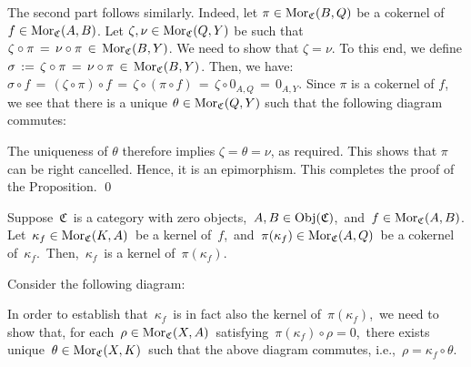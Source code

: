 \vskip 0.1cm
The second part follows similarly.
Indeed, let 
$\pi \in \textnormal{Mor}_{\mathfrak{C}}(B,Q)$ be a cokernel of $f \in \textnormal{Mor}_{\mathfrak{C}}(A,B)$.
Let $\zeta, \nu \in \textnormal{Mor}_{\mathfrak{C}}(Q,Y)$ be such that
$\zeta \circ \pi \,=\, \nu \circ \pi \,\in\, \textnormal{Mor}_{\mathfrak{C}}(B,Y)$.
We need to show that $\zeta = \nu$.
To this end, we define $\sigma \,:=\, \zeta \circ \pi \,=\, \nu \circ \pi \,\in\, \textnormal{Mor}_{\mathfrak{C}}(B,Y)$.
Then, we have: 
$\sigma \circ f \,=\, (\zeta \circ \pi) \circ f \,=\, \zeta \circ (\pi \circ f) \,=\, \zeta \circ 0_{A,Q} \,=\, 0_{A,Y}$.
Since $\pi$ is a cokernel of $f$, we see that there is a unique $\theta \in \textnormal{Mor}_{\mathfrak{C}}(Q,Y)$
such that the following diagram commutes:
\begin{center}
\end{center}
The uniqueness of $\theta$ therefore implies $\zeta = \theta = \nu$, as required.
This shows that $\pi$ can be right cancelled.
Hence, it is an epimorphism.
This completes the proof of the Proposition.
\qed


\vskip 0.5cm
\begin{proposition}
\mbox{}
\vskip 0.1cm
\noindent
Suppose \,$\mathfrak{C}$\, is a category with zero objects,
\,$A, B \in \textnormal{Obj}(\mathfrak{C})$,\, and
\,$f \in \textnormal{Mor}_{\mathfrak{C}}(A,B)$.
Let \,$\kappa_{f} \in \textnormal{Mor}_{\mathfrak{C}}(K,A)$\, be a kernel of \,$f$,\,
and \,$\pi(\kappa_{f}) \in \textnormal{Mor}_{\mathfrak{C}}(A,Q)$\, be a cokernel of \,$\kappa_{f}$.\,
Then, \,$\kappa_{f}$\, is a kernel of \,$\pi(\kappa_{f})$.
\end{proposition}
\proof
Consider the following diagram:
\begin{center}
\end{center}
In order to establish that \,$\kappa_{f}$\, is in fact also the kernel of \,$\pi(\kappa_{f})$,\,
we need to show that, for each \,$\rho \in \textnormal{Mor}_{\mathfrak{C}}(X,A)$\, satisfying \,$\pi(\kappa_{f}) \circ \rho = 0$,\,
there exists unique \,$\theta \in \textnormal{Mor}_{\mathfrak{C}}(X,K)$\, such that the above diagram commutes, i.e.,
\,$\rho = \kappa_{f} \circ \theta$.\,

